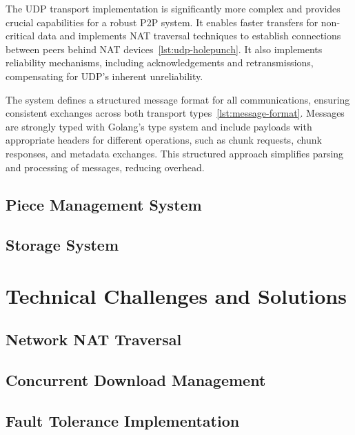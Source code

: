 \documentclass[12pt,a4paper]{report}
\begin{document}
The UDP transport implementation is significantly more complex and provides crucial capabilities for a robust P2P system. It enables faster transfers for non-critical data and implements NAT traversal techniques to establish connections between peers behind NAT devices~\ref{lst:udp-holepunch}. It also implements reliability mechanisms, including acknowledgements and retransmissions, compensating for UDP's inherent unreliability.

The system defines a structured message format for all communications, ensuring consistent exchanges across both transport types~\ref{lst:message-format}. Messages are strongly typed with Golang's type system and include payloads with appropriate headers for different operations, such as chunk requests, chunk responses, and metadata exchanges. This structured approach simplifies parsing and processing of messages, reducing overhead.

\section{Piece Management System}

\section{Storage System}

\chapter{Technical Challenges and Solutions}
\section{Network NAT Traversal}

\section{Concurrent Download Management}

\section{Fault Tolerance Implementation}
\end{document}
